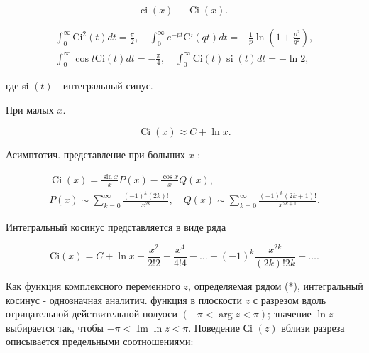 \documentclass[10pt]{article}
\begin{document}
\[

\operatorname{ci}(x) \equiv \operatorname{Ci}(x) \text {. }

\]



\[

\begin{gathered}

\int_{0}^{\infty} \mathrm{Ci}^{2}(t) d t=\frac{\pi}{2}, \quad \int_{0}^{\infty} e^{-p t} \mathrm{Ci}(q t) d t=-\frac{1}{p} \ln \left(1+\frac{p^{2}}{q^{2}}\right), \\

\int_{0}^{\infty} \cos t \mathrm{Ci}(t) d t=-\frac{\pi}{4}, \quad \int_{0}^{\infty} \mathrm{Ci}(t) \operatorname{si}(t) d t=-\ln 2,

\end{gathered}

\]



где si $(t)$ - интегральный синус.



При малых $x$.



\[

\operatorname{Ci}(x) \approx C+\ln x .

\]



Асимптотич. представление при больших $x$ :



\[

\begin{gathered}

\operatorname{Ci}(x)=\frac{\sin x}{x} P(x)-\frac{\cos x}{x} Q(x), \\

P(x) \sim \sum_{k=0}^{\infty} \frac{(-1)^{k}(2 k) !}{x^{2 k}}, \quad Q(x) \sim \sum_{k=0}^{\infty} \frac{(-1)^{k}(2 k+1) !}{x^{2 k+1}} .

\end{gathered}

\]



Интегральный косинус представляется в виде ряда



\[

\mathrm{Ci}(x)=C+\ln x-\frac{x^{2}}{2 ! 2}+\frac{x^{4}}{4 ! 4}-\ldots+(-1)^{k} \frac{x^{2 k}}{(2 k) ! 2 k}+\ldots .

\]



Как функция комплексного переменного $z$, определяемая рядом (*), интегральный косинус - однозначная аналитич. функция в плоскости $z$ с разрезом вдоль отрицательной действительной полуоси $(-\pi<\arg z<\pi)$; значение $\ln z$ выбирается так, чтобы $-\pi<\operatorname{Im} \ln z<\pi$. Поведение Сi $(z)$ вблизи разреза описывается предельными соотношениями:
\end{document}

